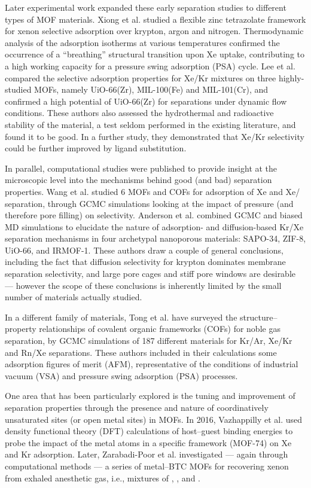 \documentclass[main.tex]{subfiles}
\begin{document}
Later experimental work expanded these early separation studies to different types of MOF materials. Xiong et al.\cite{Xiong_2015} studied a flexible zinc tetrazolate framework for xenon selective adsorption over krypton, argon and nitrogen. Thermodynamic analysis of the adsorption isotherms at various temperatures confirmed the occurrence of a ``breathing'' structural transition upon Xe uptake, contributing to a high working capacity for a pressure swing adsorption (PSA) cycle. Lee et al.\cite{Lee_2016} compared the selective adsorption properties for Xe/Kr mixtures on three highly-studied MOFs, namely UiO-66(Zr), MIL-100(Fe) and MIL-101(Cr), and confirmed a high potential of UiO-66(Zr) for separations under dynamic flow conditions. These authors also assessed the hydrothermal and radioactive stability of the material, a test seldom performed in the existing literature, and found it to be good. In a further study,\cite{Lee_2018} they demonstrated that Xe/Kr selectivity could be further improved by ligand substitution.

In parallel, computational studies were published to provide insight at the microscopic level into the mechanisms behind good (and bad) separation properties. Wang et al.\cite{Wang_2014} studied 6 MOFs and COFs for adsorption of Xe and Xe/ separation, through GCMC simulations looking at the impact of pressure (and therefore pore filling) on selectivity. Anderson et al.\cite{Anderson_2017} combined GCMC and biased MD simulations to elucidate the nature of adsorption- and diffusion-based Kr/Xe separation mechanisms in four archetypal nanoporous materials: SAPO-34, ZIF-8, UiO-66, and IRMOF-1. These authors draw a couple of general conclusions, including the fact that diffusion selectivity for krypton dominates membrane separation selectivity, and large pore cages and stiff pore windows are desirable --- however the scope of these conclusions is inherently limited by the small number of materials actually studied.

In a different family of materials, Tong et al.\cite{Tong_2017} have surveyed the structure--property relationships of covalent organic frameworks (COFs) for noble gas separation, by GCMC simulations of 187 different materials for Kr/Ar, Xe/Kr and Rn/Xe separations. These authors included in their calculations some adsorption figures of merit (AFM), representative of the conditions of industrial vacuum (VSA) and pressure swing adsorption (PSA) processes.

One area that has been particularly explored is the tuning and improvement of separation properties through the presence and nature of coordinatively unsaturated sites (or open metal sites) in MOFs. In 2016, Vazhappilly et al.\cite{Vazhappilly_2016} used density functional theory (DFT) calculations of host--guest binding energies to probe the impact of the metal atoms in a specific framework (MOF-74) on Xe and Kr adsorption. Later, Zarabadi-Poor et al.\cite{ZarabadiPoor_2018} investigated --- again through computational methods --- a series of metal--BTC MOFs for recovering xenon from exhaled anesthetic gas, i.e., mixtures of , , and .
\end{document}
